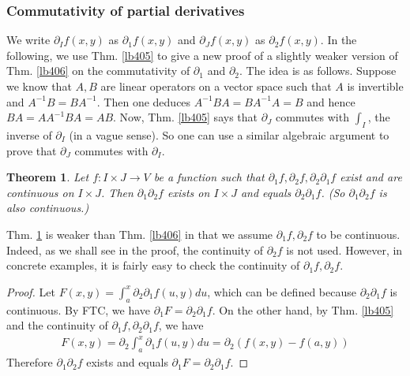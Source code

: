 \documentclass[12pt,b5paper,notitlepage]{article}
\theoremstyle{definition}
\theoremstyle{plain}
\newtheorem{thm}[df]{Theorem}
\newcommand{\dps}{\displaystyle}
\numberwithin{equation}{section}
\begin{document}
\subsubsection{Commutativity of partial derivatives}


We write $\partial_If(x,y)$ as $\partial_1f(x,y)$ and $\partial_Jf(x,y)$ as $\partial_2f(x,y)$. In the following, we use Thm. \ref{lb405} to give a new proof of a slightly weaker version of Thm. \ref{lb406} on the commutativity of $\partial_1$ and $\partial_2$. The idea is as follows. Suppose we know that $A,B$ are linear operators on a vector space such that $A$ is invertible and $A^{-1}B=BA^{-1}$. Then one deduces $A^{-1}BA=BA^{-1}A=B$ and hence $BA=AA^{-1}BA=AB$. Now, Thm. \ref{lb405} says that $\partial_J$  commutes with $\int_I$, the inverse of $\partial_I$ (in a vague sense). So one can use a similar algebraic argument to prove that $\partial_J$ commutes with $\partial_I$.



\begin{thm}\label{lb407}
Let $f:I\times J\rightarrow V$ be a function such that $\partial_1f,\partial_2f,\partial_2\partial_1f$ exist and are continuous on $I\times J$. Then $\partial_1\partial_2f$ exists on $I\times J$ and equals $\partial_2\partial_1f$. (So $\partial_1\partial_2f$ is also continuous.)
\end{thm}


Thm. \ref{lb407} is weaker than Thm. \ref{lb406} in that we assume $\partial_1f,\partial_2f$ to be continuous. Indeed, as we shall see in the proof, the continuity of $\partial_2f$ is not used. However, in concrete examples, it is fairly easy to check the continuity of  $\partial_1f,\partial_2f$. 


\begin{proof}
Let $\dps F(x,y)=\int_a^x\partial_2\partial_1 f(u,y)du$, which can be defined because $\partial_2\partial_1f$ is continuous. By FTC, we have $\partial_1F=\partial_2\partial_1f$. On the other hand, by Thm. \ref{lb405} and the continuity of $\partial_1f,\partial_2\partial_1f$, we have
\begin{align*}
F(x,y)=\partial_2\int_a^x\partial_1f(u,y)du=\partial_2(f(x,y)-f(a,y))
\end{align*}
Therefore $\partial_1\partial_2f$ exists and equals $\partial_1F=\partial_2\partial_1f$.
\end{proof}
\end{document}
